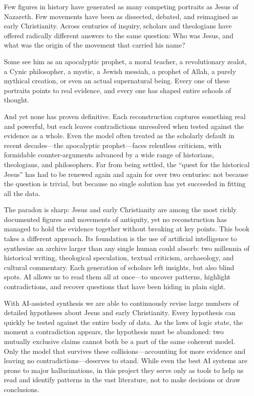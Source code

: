 Few figures in history have generated as many competing portraits as Jesus of Nazareth.
Few movements have been as dissected, debated, and reimagined as early Christianity.
Across centuries of inquiry, scholars and theologians have offered radically different answers to the same question: Who was Jesus, and what was the origin of the movement that carried his name?

Some see him as an apocalyptic prophet, a moral teacher, a revolutionary zealot, a Cynic philosopher, a mystic, a Jewish messiah, a prophet of Allah, a purely mythical creation, or even an actual supernatural being.
Every one of these portraits points to real evidence, and every one has shaped entire schools of thought.

And yet none has proven definitive.
Each reconstruction captures something real and powerful, but each leaves contradictions unresolved when tested against the evidence as a whole.
Even the model often treated as the scholarly default in recent decades—the apocalyptic prophet—faces relentless criticism, with formidable counter-arguments advanced by a wide range of historians, theologians, and philosophers.
Far from being settled, the ``quest for the historical Jesus'' has had to be renewed again and again for over two centuries: not because the question is trivial, but because no single solution has yet succeeded in fitting all the data.

The paradox is sharp: Jesus and early Christianity are among the most richly documented figures and movements of antiquity, yet no reconstruction has managed to hold the evidence together without breaking at key points.
This book takes a different approach.
Its foundation is the use of artificial intelligence to synthesize an archive larger than any single human could absorb: two millennia of historical writing, theological speculation, textual criticism, archaeology, and cultural commentary.
Each generation of scholars left insights, but also blind spots.
AI allows us to read them all at once—to uncover patterns, highlight contradictions, and recover questions that have been hiding in plain sight.

With AI-assisted synthesis we are able to continuously revise large numbers of detailed hypotheses about Jesus and early Christianity.
Every hypothesis can quickly be tested against the entire body of data.
As the laws of logic state, the moment a contradiction appears, the hypothesis must be abandoned: two mutually exclusive claims cannot both be a part of the same coherent model.
Only the model that survives these collisions---accounting for more evidence and leaving no contradictions---deserves to stand.
While even the best AI systems are prone to major hallucinations, in this project they serve only as tools to help us read and identify patterns in the vast literature, not to make decisions or draw conclusions.

